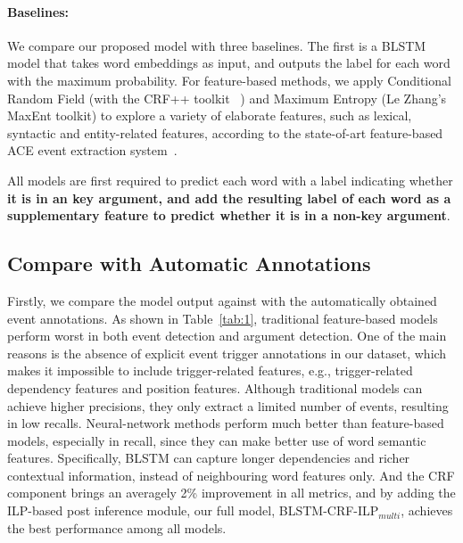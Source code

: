 \paragraph{Baselines:}
We compare our proposed model with three baselines. %
The first is a  BLSTM model that takes word embeddings as input, and outputs the label for each word with the maximum probability. %
For feature-based methods, we apply Conditional Random Field \cite{lafferty2001conditional} (with the CRF++ toolkit~\cite{kudo2005crf++} ) and Maximum Entropy \cite{berger1996maximum} (Le Zhang's MaxEnt toolkit) to explore a variety of elaborate features, such as lexical, syntactic and entity-related features, according to the state-of-art feature-based ACE event extraction system~\cite{li2013joint}.

All models are first required to predict each word with a label indicating whether \textbf{it is in an key argument, and add the resulting label of each word as a supplementary feature to predict whether it is in a non-key argument}.


\subsection{Compare with Automatic Annotations}
Firstly, we compare the model output against with the automatically obtained event annotations.
As shown in Table~\ref{tab:1}, traditional feature-based models perform worst in both event detection and argument detection.
One of the main reasons is the absence of explicit event trigger annotations in our dataset, which makes it impossible to include trigger-related features, e.g., trigger-related dependency features and position features.
Although traditional models can achieve higher precisions, they only extract a limited number of events, resulting in low recalls.
Neural-network methods perform much better than feature-based models, especially in recall, since they can make better use of word semantic features. Specifically, BLSTM can capture longer dependencies and richer contextual information, instead of neighbouring word features only.
And the CRF component brings an averagely 2\% improvement in all metrics, and by adding the ILP-based post inference module, our full model, BLSTM-CRF-ILP$_{multi}$, achieves the best performance among all models.

